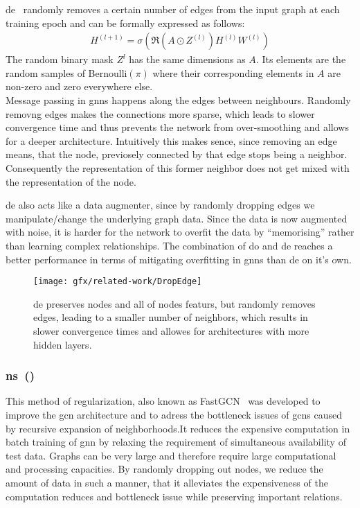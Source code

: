 \ac{de}~\cite{Rong2020} randomly removes a certain number of edges from the input graph at each training epoch and can be formally expressed as follows:
\begin{align*}
    H^{(l+1)} = \sigma(\mathfrak{R}(A \odot Z^{(l)}) H^{(l)} W^{(l)})
\end{align*}
The random binary mask $Z^{l}$ has the same dimensions as $A$.
Its elements are the random samples of Bernoulli$(\pi)$ where their
corresponding elements in $A$ are non-zero and zero everywhere else. \\
Message passing in \acp{gnn} happens along the edges between neighbours.
Randomly removng edges makes the connections more sparse, which
leads to slower convergence time and thus prevents the
network from over-smoothing and allows for a deeper architecture.
Intuitively this makes sence, since removing an edge means, that the node, previosely connected by that edge stops being a neighbor. Consequently the representation of this former neighbor does not get mixed with the representation of the node.

\Ac{de} also acts like a data augmenter, since by randomly dropping edges we manipulate/change the underlying graph data. Since the data is now augmented with noise, it is harder for the network to overfit the data by ``memorising'' rather than learning complex relationships.
The combination of \ac{do} and \ac{de} reaches a better performance in
terms of mitigating overfitting in \acp{gnn} than \ac{de} on it's own.

\begin{figure}[ht]
    \centering
    \texttt{[image: gfx/related-work/DropEdge]}
    \caption{\acf{de} preserves nodes and all of nodes featurs, but randomly removes
        edges, leading to a smaller number of neighbors, which results in slower convergence times and allowes for architectures with more hidden layers.}\label{fig:related:DropEdge}
\end{figure}
\subsubsection{\acl*{ns}~(\citeauthor{Chen2018})}
\label{sec:related:pred:regularization:ns}
This method of regularization, also known as FastGCN~\cite{Chen2018} was
developed to improve the \ac{gcn} \cite{Kipf2017} architecture and to adress the bottleneck issues of \acp{gcn} caused by recursive expansion of neighborhoods.It reduces the expensive computation in batch training of \ac{gnn} by relaxing the requirement of simultaneous availability of test data. Graphs can be very large and therefore require large computational and processing capacities. By randomly dropping out nodes, we reduce the amount of data in such a manner, that it alleviates the expensiveness of the computation reduces and bottleneck issue while preserving important relations.

